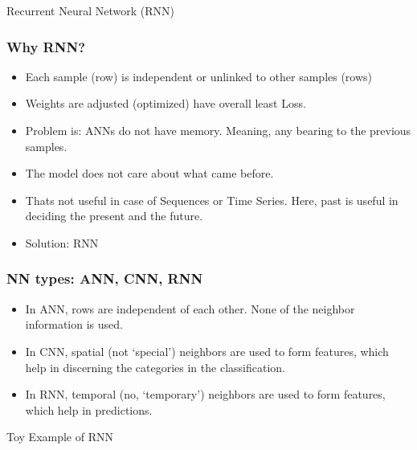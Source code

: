 \begin{frame}
  \begin{center}
    {\Large Recurrent Neural Network (RNN)}
  \end{center}
\end{frame}

\begin{frame}[fragile] \frametitle{Why RNN?}

\begin{itemize}
\item Each sample (row) is independent or unlinked to other samples (rows)
\item Weights are adjusted (optimized) have overall least Loss.
\item Problem is: ANNs do not have memory. Meaning, any bearing to the previous samples.
\item The model does not care about what came before.
\item Thats not useful in case of Sequences or Time Series. Here, past is useful in deciding the present and the future.
\item Solution: RNN
\end{itemize}


\end{frame}

\begin{frame}[fragile] \frametitle{NN types: ANN, CNN, RNN}

\begin{itemize}
\item In ANN, rows are independent of each other. None of the neighbor information is used.
\item In CNN, spatial (not `special') neighbors are used to form features, which help in discerning the categories in the classification.
\item In RNN, temporal (no, `temporary') neighbors are used to form features, which help in predictions.
\end{itemize}


\end{frame}



\begin{frame}
  \begin{center}
    {\Large Toy Example of RNN}
  \end{center}
\end{frame}


